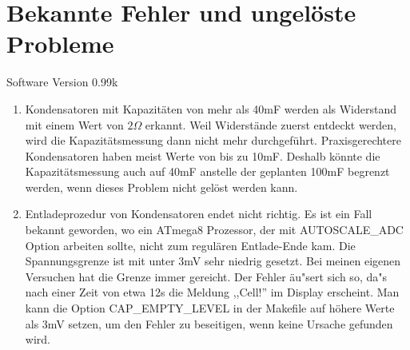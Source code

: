 
\chapter{Bekannte Fehler und ungel\"oste Probleme}
{\center Software Version 0.99k}

\begin{enumerate}
\item Kondensatoren mit Kapazit\"aten von mehr als 40mF werden als Widerstand mit einem Wert von \(2\Omega\) erkannt.
Weil Widerst\"ande zuerst entdeckt werden, wird die Kapazit\"atsmessung dann nicht mehr durchgef\"uhrt.
Praxisgerechtere Kondensatoren haben meist Werte von bis zu 10mF.
Deshalb k\"onnte die Kapazit\"atsmessung auch auf 40mF anstelle der geplanten 100mF begrenzt werden, wenn dieses Problem nicht
gel\"ost werden kann.
\item Entladeprozedur von Kondensatoren endet nicht richtig. Es ist ein Fall bekannt geworden, wo ein ATmega8 Prozessor,
der mit AUTOSCALE\_ADC Option arbeiten sollte, nicht zum regul\"aren Entlade-Ende kam.
Die Spannungsgrenze ist mit unter 3mV sehr niedrig gesetzt. Bei meinen eigenen Versuchen hat die Grenze immer gereicht.
Der Fehler \"au"sert sich so, da"s nach einer Zeit von etwa 12s die Meldung ,,Cell!'' im Display erscheint.
Man kann die Option CAP\_EMPTY\_LEVEL in der Makefile auf h\"ohere Werte als 3mV setzen, um den Fehler zu beseitigen,
wenn keine Ursache gefunden wird.

\end{enumerate}
